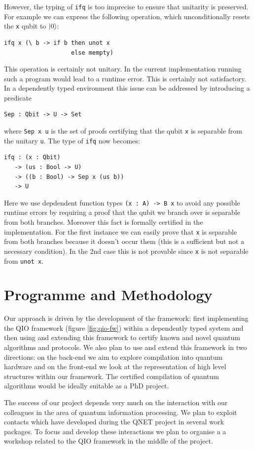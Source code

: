 \documentclass[a4paper]{article}
\begin{document}
However, the typing of \texttt{ifq} is too imprecise to ensure that
unitarity is preserved. For example we can express the following
operation, which unconditionally resets the \texttt{x} qubit to $\mathinner{|{0}\rangle}$:
\begin{verbatim}
ifq x (\ b -> if b then unot x 
                   else mempty)  
\end{verbatim}
This operation is certainly not unitary. In the current implementation
running such a program would lead to a runtime error. This is
certainly not 
satisfactory. In a dependently typed environment this issue can be
addressed by introducing a predicate
\begin{verbatim}
Sep : Qbit -> U -> Set
\end{verbatim}
where \verb+Sep x u+ is the set of proofs certifying that the qubit \texttt{x} is separable
from the unitary \texttt{u}. The type of \texttt{ifq} now becomes:
\begin{verbatim}
ifq : (x : Qbit) 
   -> (us : Bool -> U) 
   -> ((b : Bool) -> Sep x (us b)) 
   -> U  
\end{verbatim}
Here we use depdendent function types \verb+(x : A) -> B x+ to 
avoid any possible runtime errors by requiring a proof
that the qubit we branch over is separable from both
branches. Moreover this fact is formally certified in the
implementation. For the first instance we can easily prove that
\texttt{x} is separable from both branches because it doesn't occur
them (this is a sufficient but not a necessary condition). In the 2nd
case this is not provable since \texttt{x} is not separable from
\verb+unot x+.

\section{Programme and Methodology}

Our approach is driven by the development of the framework: first
implementing the QIO framework (figure \ref{fig:qio-fw}) within a dependently typed system and
then using and extending this framework to certify known and novel
quantum algorithms and protocols. We also plan to use and extend this
framework in two directions: on the back-end we aim to explore compilation
into quantum hardware and on the front-end we look at the
representation of high level structures within our framework. The
certified compilation of quantum algorithms would be ideally suitable
as a PhD project. 

The success of our project depends very much on the interaction with
our colleagues in the area of quantum information processing. We plan
to exploit contacts which have developed during the QNET project in
several work packages. To focus and develop these interactions we plan
to organise a a workshop related to the QIO framework in the middle of
the project.
\end{document}
